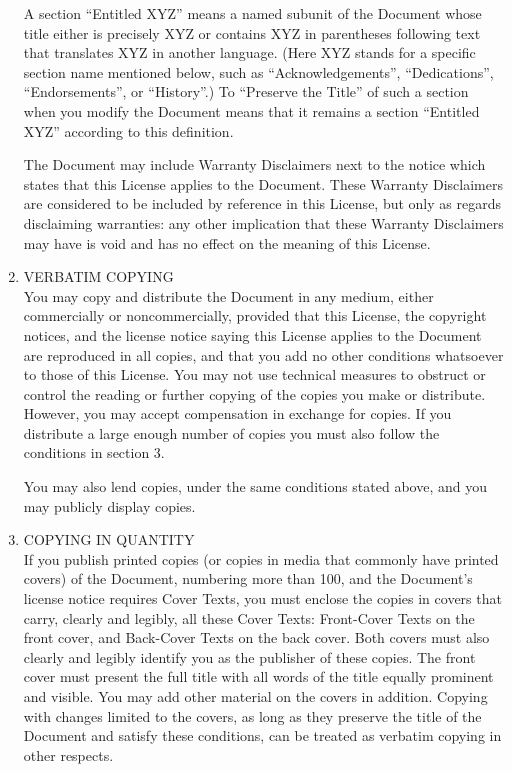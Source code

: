 \begin{enumerate}
  A section ``Entitled XYZ'' means a named subunit of the Document
  whose title either is precisely XYZ or contains XYZ in parentheses
  following text that translates XYZ in another language.  (Here XYZ
  stands for a specific section name mentioned below, such as
  ``Acknowledgements'', ``Dedications'', ``Endorsements'', or
  ``History''.)  To ``Preserve the Title'' of such a section when you
  modify the Document means that it remains a section ``Entitled XYZ''
  according to this definition.

  The Document may include Warranty Disclaimers next to the notice
  which states that this License applies to the Document.  These
  Warranty Disclaimers are considered to be included by reference in
  this License, but only as regards disclaiming warranties: any other
  implication that these Warranty Disclaimers may have is void and has
  no effect on the meaning of this License.

\item VERBATIM COPYING \\
  You may copy and distribute the Document in any medium, either
  commercially or noncommercially, provided that this License, the
  copyright notices, and the license notice saying this License
  applies to the Document are reproduced in all copies, and that you
  add no other conditions whatsoever to those of this License.  You
  may not use technical measures to obstruct or control the reading or
  further copying of the copies you make or distribute.  However, you
  may accept compensation in exchange for copies.  If you distribute a
  large enough number of copies you must also follow the conditions in
  section 3.

  You may also lend copies, under the same conditions stated above,
  and you may publicly display copies.

\item COPYING IN QUANTITY \\
  If you publish printed copies (or copies in media that commonly have
  printed covers) of the Document, numbering more than 100, and the
  Document's license notice requires Cover Texts, you must enclose the
  copies in covers that carry, clearly and legibly, all these Cover
  Texts: Front-Cover Texts on the front cover, and Back-Cover Texts on
  the back cover.  Both covers must also clearly and legibly identify
  you as the publisher of these copies.  The front cover must present
  the full title with all words of the title equally prominent and
  visible.  You may add other material on the covers in addition.
  Copying with changes limited to the covers, as long as they preserve
  the title of the Document and satisfy these conditions, can be
  treated as verbatim copying in other respects.


\end{enumerate}
